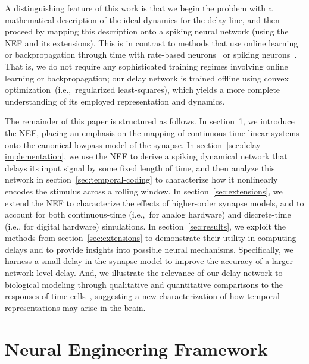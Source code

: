 \documentclass[12pt]{article}
\theoremstyle{definition}
\begin{document}
A distinguishing feature of this work is that we begin the problem with a mathematical description of the ideal dynamics for the delay line, and then proceed by mapping this description onto a spiking neural network (using the NEF and its extensions).
This is in contrast to methods that use online learning or backpropagation through time with rate-based neurons~\citep{de1992gamma, sussillo2009generating} or spiking neurons~\citep{nicola2016supervised, huh2017gradient, gilra2017predicting, alemi2017learning}.
That is, we do not require any sophisticated training regimes involving online learning or backpropagation; our delay network is trained offline using convex optimization~(i.e.,~regularized least-squares), which yields a more complete understanding of its employed representation and dynamics.

The remainder of this paper is structured as follows.
In section~\ref{sec:nef}, we introduce the NEF, placing an emphasis on the mapping of continuous-time linear systems onto the canonical lowpass model of the synapse.
In section~\ref{sec:delay-implementation}, we use the NEF to derive a spiking dynamical network that delays its input signal by some fixed length of time, and then analyze this network in section~\ref{sec:temporal-coding} to characterize how it nonlinearly encodes the stimulus across a rolling window.
In section~\ref{sec:extensions}, we extend the NEF to characterize the effects of higher-order synapse models, and to account for both continuous-time (i.e.,~for analog hardware) and discrete-time (i.e., for digital hardware) simulations.
In section~\ref{sec:results}, we exploit the methods from section~\ref{sec:extensions} to demonstrate their utility in computing delays and to provide insights into possible neural mechanisms.
Specifically, we harness a small delay in the synapse model to improve the accuracy of a larger network-level delay.
And, we illustrate the relevance of our delay network to biological modeling through qualitative and quantitative comparisons to the responses of time cells~\citep{eichenbaum2014}, suggesting a new characterization of how temporal representations may arise in the brain.

\section{Neural Engineering Framework}
\label{sec:nef}
\end{document}
